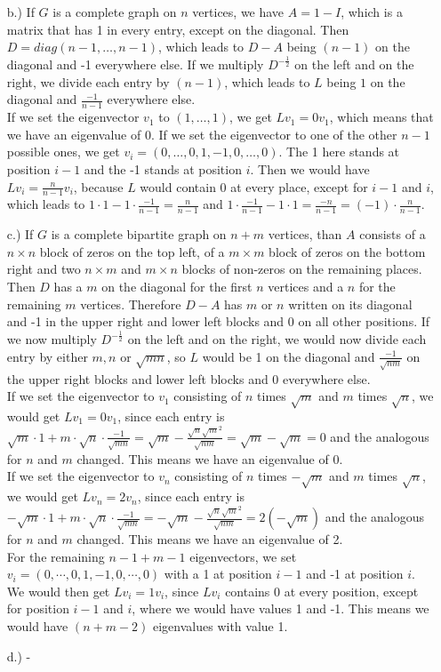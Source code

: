 \documentclass[%
   10pt,              %
   a4paper,           %
   DIV10,             %
]{scrartcl}%
\begin{document}
\begin{itemize}
	\item[b.)] If $G$ is a complete graph on $n$ vertices, we have $A = 1 - I$, which is a matrix that has 1 in every entry, except on the diagonal. Then $D = diag(n-1, \dots, n-1)$, which leads to $D - A$ being $(n-1)$ on the diagonal and -1 everywhere else. If we multiply $D^{-\frac{1}{2}}$ on the left and on the right, we divide each entry by $(n-1)$, which leads to $L$ being $1$ on the diagonal and $\frac{-1}{n-1}$ everywhere else.\\
	\noindent If we set the eigenvector $v_1$ to $(1, \dots, 1)$, we get $L v_1 = 0 v_1$, which means that we have an eigenvalue of 0. If we set the eigenvector to one of the other $n-1$ possible ones, we get $v_i = (0, \dots, 0,1,-1,0, \dots, 0)$. The 1 here stands at position $i-1$ and the -1 stands at position $i$. Then we would have $L v_i = \frac{n}{n-1} v_i$, because $L$ would contain 0 at every place, except for $i-1$ and $i$, which leads to $1 \cdot 1 - 1 \cdot \frac{-1}{n-1} = \frac{n}{n-1}$ and $1 \cdot \frac{-1}{n-1} - 1 \cdot 1 = \frac{-n}{n-1} = (-1) \cdot  \frac{n}{n-1}$.
	\item[c.)] If $G$ is a complete bipartite graph on $n+m$ vertices, than $A$ consists of a $n \times n$ block of zeros on the top left, of a $m \times m$ block of zeros on the bottom right and two $n \times m$ and $m\times n$ blocks of non-zeros on the remaining places. Then $D$ has a $m$ on the diagonal for the first $n$ vertices and a $n$ for the remaining $m$ vertices. Therefore $D-A$ has $m$ or $n$ written on its diagonal and -1 in the upper right and lower left blocks and 0 on all other positions. If we now multiply $D^{-\frac{1}{2}}$ on the left and on the right, we would now divide each entry by either $m, n$ or $\sqrt{mn}$, so $L$ would be 1 on the diagonal and $\frac{-1}{\sqrt{nm}}$ on the upper right blocks and lower left blocks and 0 everywhere else.\\
	\noindent If we set the eigenvector to $v_1$ consisting of $n$ times $\sqrt{m}$ and $m$ times $\sqrt{n}$, we would get $L v_1 = 0 v_1$, since each entry is $\sqrt{m} \cdot 1 + m \cdot \sqrt{n} \cdot \frac{-1}{\sqrt{mn}} = \sqrt{m} - \frac{\sqrt{n} \sqrt{m}^2}{\sqrt{nm}} = \sqrt{m} - \sqrt{m} = 0$ and the analogous for $n$ and $m$ changed. This means we have an eigenvalue of 0.\\
	\noindent If we set the eigenvector to $v_n$ consisting of $n$ times $-\sqrt{m}$ and $m$ times $\sqrt{n}$, we would get $L v_n = 2 v_n$, since each entry is $-\sqrt{m} \cdot 1 + m \cdot \sqrt{n} \cdot \frac{-1}{\sqrt{mn}} = -\sqrt{m} - \frac{\sqrt{n} \sqrt{m}^2}{\sqrt{nm}} = 2(-\sqrt{m})$ and the analogous for $n$ and $m$ changed. This means we have an eigenvalue of 2.\\
	\noindent For the remaining $n-1 + m-1$ eigenvectors, we set $v_i = (0, \cdots, 0, 1, -1, 0, \cdots, 0)$ with a 1 at position $i-1$ and -1 at position $i$. We would then get $L v_i = 1 v_i$, since $L v_i$ contains 0 at every position, except for position $i-1$ and $i$, where we would have values 1 and -1. This means we would have $(n+m-2)$ eigenvalues with value 1. 
	\item[d.)] -
\end{itemize}
\end{document}
